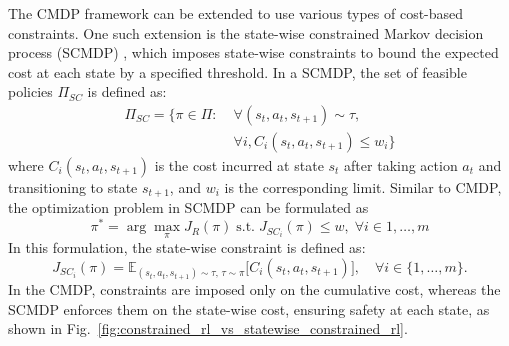 The CMDP framework can be extended to use various types of cost-based constraints.
One such extension is the state-wise constrained Markov decision process (SCMDP) \cite{zhao2023state}, which imposes state-wise constraints to bound the expected cost at each state by a specified threshold.
In a SCMDP, the set of feasible policies $\Pi_{SC}$ is defined as:
\begin{equation} \label{eq:feasible_policy_set_scmdp}
    \begin{aligned}    
        \Pi_{SC} = \{ \pi \in \Pi: &\; \forall (s_t, a_t, s_{t + 1}) \sim \tau, \\
                                &\; \forall i, C_i(s_t, a_t, s_{t + 1}) \leq w_i \}
    \end{aligned}
\end{equation}
where $C_i(s_t, a_t, s_{t + 1})$ is the cost incurred at state $s_t$ after taking action $a_t$ and transitioning to state $s_{t + 1}$, and $w_i$ is the corresponding limit.
Similar to CMDP, the optimization problem in SCMDP can be formulated as
\begin{equation} \label{eq:scmdp_optimization_problem}
    \pi^* = \arg\max_\pi J_R(\pi) \; \text{s.t.} \; J_{SC_i}(\pi) \leq w, \; \forall i \in 1, \ldots, m
\end{equation}  %
In this formulation, the state-wise constraint is defined as:
\begin{equation} \label{eq:statewise_cost_return}
    J_{SC_i}(\pi) = \mathbb{E}_{(s_t, a_t, s_{t + 1}) \sim \tau, \, \tau \sim \pi} \big[ C_i(s_t, a_t, s_{t + 1}) \big], 
    \quad \forall i \in \{1, \ldots, m\}.
\end{equation}
In the CMDP, constraints are imposed only on the cumulative cost, whereas the SCMDP enforces them on the state-wise cost, ensuring safety at each state, as shown in Fig.~\ref{fig:constrained_rl_vs_statewise_constrained_rl}.
